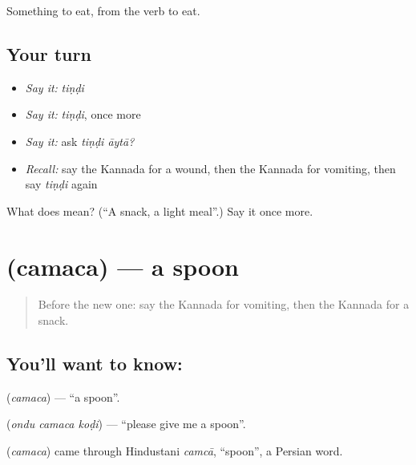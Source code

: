 \begin{grammarlens}[title={What you've built}]
Something to eat, from the verb to eat.
\end{grammarlens}

\subsection*{Your turn}
\begin{itemize}
\raggedright
  \item \emph{Say it:} \emph{tiṇḍi}
  \item \emph{Say it:} \emph{tiṇḍi}, once more
  \item \emph{Say it:} ask \emph{tiṇḍi āytā?}
  \item \emph{Recall:} say the Kannada for a wound, then the Kannada for vomiting, then say \emph{tiṇḍi} again
\end{itemize}

\begin{tcolorbox}[breakable,colback=teal!4,colframe=teal!35!black,title={Before you move on}]
What does  mean? (\textquotedblleft{}A snack, a light meal\textquotedblright{}.) Say it once more.
\end{tcolorbox}
\section[\texorpdfstring{\kn{ಚಮಚ} (camaca)}{ಚಮಚ (camaca)}]{ (camaca) — a spoon}

\label{lesson:KA-C94-spoon}



\begin{quote}
Before the new one: say the Kannada for vomiting, then the Kannada for a snack.
\end{quote}

\subsection*{You'll want to know: }
\textbf{} (\emph{camaca}) — \textquotedblleft{}a spoon\textquotedblright{}.

\textbf{  } (\emph{ondu camaca koḍi}) — \textquotedblleft{}please give me a spoon\textquotedblright{}.

\begin{cousinweb}
\textbf{} (\emph{camaca}) came through Hindustani \emph{camcā}, \textquotedblleft{}spoon\textquotedblright{}, a Persian word.
\end{cousinweb}

